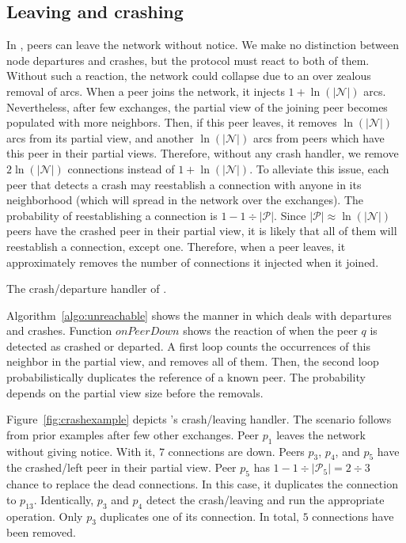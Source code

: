 \subsection{Leaving and crashing}
\label{subsec:leaving}

In \SPRAY, peers can leave the network without notice. We make no
distinction between node departures and crashes, but the protocol must
react to both of them. Without such a reaction, the network could
collapse due to an over zealous removal of arcs. When a peer joins the
network, it injects $1+\ln(|\mathcal{N}|)$ arcs. Nevertheless, after
few exchanges, the partial view of the joining peer becomes populated
with more neighbors. Then, if this peer leaves, it removes
$\ln(|\mathcal{N}|)$ arcs from its partial view, and another
$\ln(|\mathcal{N}|)$ arcs from peers which have this peer in their
partial views. Therefore, without any crash handler, we remove
$2\ln(|\mathcal{N}|)$ connections instead of
$1+\ln(|\mathcal{N}|)$. To alleviate this issue, each peer that
detects a crash may reestablish a connection with anyone in its
neighborhood (which will spread in the network over the
exchanges). The probability of reestablishing a connection is
$1-{1\div{|\mathcal{P}|}}$. Since ${|\mathcal{P}|}\approx
\ln(|\mathcal{N}|)$ peers have the crashed peer in their partial view,
it is likely that all of them will reestablish a connection, except
one. Therefore, when a peer leaves, it approximately removes the
number of connections it injected when it joined.

\begin{algorithm}[h]
  
  \caption{\label{algo:unreachable}The crash/departure handler of \SPRAY.}
\end{algorithm}

Algorithm~\ref{algo:unreachable} shows the manner in which \SPRAY deals with
departures and crashes.  Function $onPeerDown$ shows the reaction of \SPRAY
when the peer $q$ is detected as crashed or departed. A first loop counts the
occurrences of this neighbor in the partial view, and removes all of
them. Then, the second loop probabilistically duplicates the reference of a
known peer. The probability depends on the partial view size before the
removals.

Figure~\ref{fig:crashexample} depicts \SPRAY's crash/leaving handler. The
scenario follows from prior examples after few other exchanges. Peer $p_1$
leaves the network without giving notice. With it, $7$ connections are
down. Peers $p_3$, $p_4$, and $p_5$ have the crashed/left peer in their partial
view. Peer $p_5$ has $1-{1\div{|\mathcal{P}_5|}}={2\div{3}}$ chance to replace
the dead connections. In this case, it duplicates the connection to
$p_{13}$. Identically, $p_3$ and $p_4$ detect the crash/leaving and run the
appropriate operation. Only $p_3$ duplicates one of its connection. In total,
$5$ connections have been removed.

